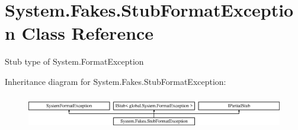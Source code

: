 \hypertarget{class_system_1_1_fakes_1_1_stub_format_exception}{\section{System.\-Fakes.\-Stub\-Format\-Exception Class Reference}
\label{class_system_1_1_fakes_1_1_stub_format_exception}
}


Stub type of System.\-Format\-Exception 


Inheritance diagram for System.\-Fakes.\-Stub\-Format\-Exception\-:\begin{figure}[H]
\begin{center}
\leavevmode
\includegraphics[height=1.505376cm]{class_system_1_1_fakes_1_1_stub_format_exception}
\end{center}
\end{figure}
